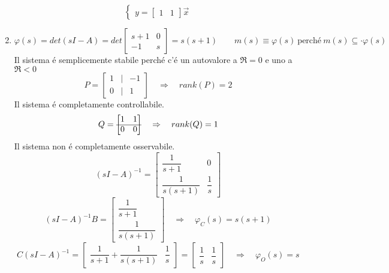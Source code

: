 \documentclass[../main.tex]{subfiles}
\begin{document}
\begin{enumerate}
\[\begin{cases}
							y =
							\begin{bmatrix}
								1 & 1
							\end{bmatrix} \vec x
						\end{cases}
					\]
				\item 
					\[
						\varphi(s) = det(sI-A) = det
						\begin{bmatrix}
							s+1 & 0\\
							-1 & s
						\end{bmatrix} = s(s+1)
						\qquad
						m(s) \equiv \varphi(s)\ \text{perch\'e}\ m(s) \subseteq\cdot \varphi(s)
					\]
					Il sistema \'e semplicemente stabile perch\'e c'\'e un autovalore a $ \Re = 0 $ e uno a $ \Re < 0 $
					\[
						P =
						\begin{bmatrix}
							1 & | & -1\\
							0 & | & 1
						\end{bmatrix}
						\quad\Rightarrow\quad
						rank(P) = 2
					\]
					Il sistema \'e completamente controllabile.
					\[
						Q =
						\begin{bmatrix}
							1 & 1\\
							\cline{1-2}
							0 & 0
						\end{bmatrix}
						\quad\Rightarrow\quad
						rank(Q) = 1
					\]
					Il sistema non \'e completamente osservabile.
					\[
						(sI-A)^{-1} =
						\begin{bmatrix}
							\dfrac{1}{s+1} & 0\\
							\dfrac{1}{s(s+1)} & \dfrac{1}{s}
						\end{bmatrix}
					\]
					\[
						(sI-A)^{-1}B =
						\begin{bmatrix}
							\dfrac{1}{s+1}\\
							\dfrac{1}{s(s+1)}
						\end{bmatrix}
						\quad\Rightarrow\quad
						\varphi_C(s) = s(s+1)
					\]
					\[
						C(sI-A)^{-1} = 
						\begin{bmatrix}
							\dfrac{1}{s+1}+\dfrac{1}{s(s+1)} & \dfrac{1}{s}
						\end{bmatrix} =
						\begin{bmatrix}
							\dfrac{1}{s} & \dfrac{1}{s}
						\end{bmatrix}
						\quad\Rightarrow\quad
						\varphi_O(s) = s
					\]
			\end{enumerate}
		
\end{document}
